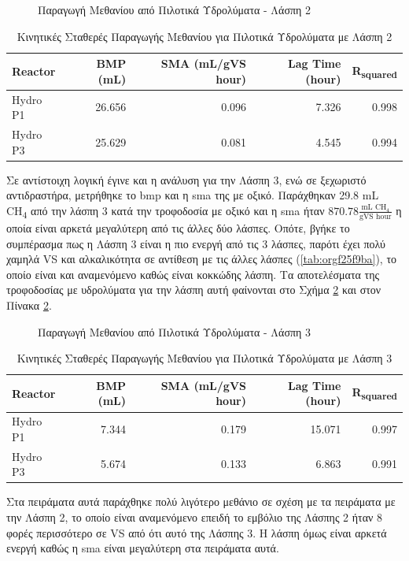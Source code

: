 \documentclass[11pt]{report}
\begin{document}
\begin{enumerate}
\begin{figure}[htbp]
\centering

\caption{\label{fig:orgc7e8f51}Παραγωγή Μεθανίου από Πιλοτικά Υδρολύματα - Λάσπη 2}
\end{figure}

\begin{table}[htbp]
\caption{\label{tab:org35f94e6}Κινητικές Σταθερές Παραγωγής Μεθανίου για Πιλοτικά Υδρολύματα με Λάσπη 2}
\centering
\begin{tabular}{lrrrr}
Reactor & BMP (mL) & SMA (mL/gVS hour) & Lag Time (hour) & R\textsubscript{squared}\\[0pt]
\hline
Hydro P1 & 26.656 & 0.096 & 7.326 & 0.998\\[0pt]
Hydro P3 & 25.629 & 0.081 & 4.545 & 0.994\\[0pt]
\end{tabular}
\end{table}

Σε αντίστοιχη λογική έγινε και η ανάλυση για την Λάσπη 3, ενώ σε ξεχωριστό αντιδραστήρα, μετρήθηκε το \acrshort{bmp} και η \acrshort{sma} της με οξικό. Παράχθηκαν 29.8 mL CH\textsubscript{4} από την λάσπη 3 κατά την τροφοδοσία με οξικό και η \acrshort{sma} ήταν \(870.78 \frac{\text{mL CH$_4$}}{\text{gVS hour}}\) η οποία είναι αρκετά μεγαλύτερη από τις άλλες δύο λάσπες. Οπότε, βγήκε το συμπέρασμα πως η Λάσπη 3 είναι η πιο ενεργή από τις 3 λάσπες, παρότι έχει πολύ χαμηλά VS και αλκαλικότητα σε αντίθεση με τις άλλες λάσπες (\ref{tab:orgf25f9ba}), το οποίο είναι και αναμενόμενο καθώς είναι κοκκώδης λάσπη. Τα αποτελέσματα της τροφοδοσίας με υδρολύματα για την λάσπη αυτή φαίνονται στο Σχήμα \ref{fig:orgd637441} και στον Πίνακα \ref{tab:orgaba9085}.

\begin{figure}[htbp]
\centering

\caption{\label{fig:orgd637441}Παραγωγή Μεθανίου από Πιλοτικά Υδρολύματα - Λάσπη 3}
\end{figure}

\begin{table}[htbp]
\caption{\label{tab:orgaba9085}Κινητικές Σταθερές Παραγωγής Μεθανίου για Πιλοτικά Υδρολύματα με Λάσπη 3}
\centering
\begin{tabular}{lrrrr}
Reactor & BMP (mL) & SMA (mL/gVS hour) & Lag Time (hour) & R\textsubscript{squared}\\[0pt]
\hline
Hydro P1 & 7.344 & 0.179 & 15.071 & 0.997\\[0pt]
Hydro P3 & 5.674 & 0.133 & 6.863 & 0.991\\[0pt]
\end{tabular}
\end{table}

Στα πειράματα αυτά παράχθηκε πολύ λιγότερο μεθάνιο σε σχέση με τα πειράματα με την Λάσπη 2, το οποίο είναι αναμενόμενο επειδή το εμβόλιο της Λάσπης 2 ήταν 8 φορές περισσότερο σε VS από ότι αυτό της Λάσπης 3. Η λάσπη όμως είναι αρκετά ενεργή καθώς η \acrshort{sma} είναι μεγαλύτερη στα πειράματα αυτά.
\end{enumerate}
\end{document}
